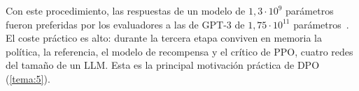 Con este procedimiento, las respuestas de un modelo de $1{,}3\cdot 10^{9}$ parámetros fueron preferidas por los evaluadores a las de GPT-3 de $1{,}75\cdot 10^{11}$ parámetros~\cite{instructgpt}. El coste práctico es alto: durante la tercera etapa conviven en memoria la política, la referencia, el modelo de recompensa y el crítico de PPO, cuatro redes del tamaño de un LLM. Esta es la principal motivación práctica de DPO (\cref{tema:5}).

